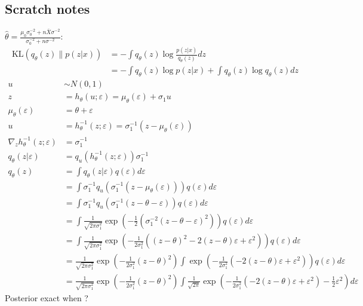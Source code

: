 \documentclass[10pt]{article}
\begin{document}
\begin{itemize}
\iffalse
\item
If mixing distribution is discrete, we may have label-switching problems, particularly with \mcmc? \citep{Chung:2004}

Example: $q(\bfeps)=\mathrm{Bernoulli}(0.5)$. Then in normal reparameterization, we end up with parameters $\{\mu_1,\Sigma_1\}$, $\{\mu_2,\Sigma_2\}$. Can we estimate these following \elbo gradient or do we get degeneracy somehow?
\fi

\end{itemize}


\subsection{Scratch notes}

$\hat{\theta}=\frac{\mu_0\sigma_0^{-2}+n\bar{X}\sigma^{-2}}{\sigma_0^{-2}+n\sigma^{-2}}$:
\begin{align*}
\mathrm{KL}(q_\theta(z)\|p(z|x)) &= - \int q_\theta(z)\log\frac{p(z|x)}{q_\theta(z)}dz \\
&= - \int q_\theta(z)\log p(z|x) + \int q_\theta(z)\log q_\theta(z)dz 
\end{align*}
\begin{align*}
u &\sim N(0,1) \\
z &= h_\theta(u;\varepsilon) = \mu_\theta(\varepsilon) + \sigma_1u \\
\mu_\theta(\varepsilon) &= \theta + \varepsilon \\
u &= h_\theta^{-1}(z;\varepsilon) = \sigma_1^{-1}(z-\mu_\theta(\varepsilon)) \\
\nabla_z h_\theta^{-1}(z;\varepsilon) &= \sigma_1^{-1} \\
q_\theta(z|\varepsilon) &= q_u(h_\theta^{-1}(z;\varepsilon))\sigma_1^{-1} \\
q_\theta(z) &= \int q_\theta(z|\varepsilon)q(\varepsilon)d\varepsilon \\
&= \int \sigma_1^{-1}q_u\left(\sigma_1^{-1}\left(z-\mu_\theta(\varepsilon)\right)\right)q(\varepsilon)d\varepsilon \\
&= \int \sigma_1^{-1}q_u\left(\sigma_1^{-1}\left(z-\theta-\varepsilon\right)\right)q(\varepsilon)d\varepsilon \\
&= \int \frac{1}{\sqrt{2\pi\sigma_1^2}}\exp\left(-\frac{1}{2}\left(\sigma_1^{-2}(z-\theta-\varepsilon)^2\right)\right)q(\varepsilon)d\varepsilon \\
&= \int \frac{1}{\sqrt{2\pi\sigma_1^2}}\exp\left(-\frac{1}{2\sigma_1^2}\left((z-\theta)^2-2(z-\theta)\varepsilon+\varepsilon^2\right)\right)q(\varepsilon)d\varepsilon \\
&= \frac{1}{\sqrt{2\pi\sigma_1^2}}\exp\left(-\frac{1}{2\sigma_1^2}(z-\theta)^2\right) \int \exp\left(-\frac{1}{2\sigma_1^2}\left(-2(z-\theta)\varepsilon+\varepsilon^2\right)\right)q(\varepsilon)d\varepsilon \\
&= \frac{1}{\sqrt{2\pi\sigma_1^2}}\exp\left(-\frac{1}{2\sigma_1^2}(z-\theta)^2\right) \int \frac{1}{\sqrt{2\pi}}\exp\left(-\frac{1}{2\sigma_1^2}\left(-2(z-\theta)\varepsilon+\varepsilon^2\right)-\frac{1}{2}\varepsilon^2\right)d\varepsilon
\end{align*}
Posterior exact when ?
\end{document}
